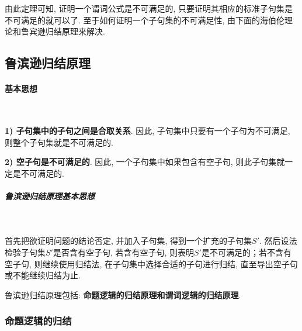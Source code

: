 由此定理可知, 证明一个谓词公式是不可满足的, 只要证明其相应的标准子句集是不可满足的就可以了. 至于如何证明一个子句集的不可满足性, 由下面的海伯伦理论和鲁宾逊归结原理来解决.

\subsection{鲁滨逊归结原理}
\paragraph{基本思想}~{}

\textbf{1) 子句集中的子句之间是合取关系}. 因此, 子句集中只要有一个子句为不可满足, 则整个子句集就是不可满足的.

\textbf{2) 空子句是不可满足的}. 因此, 一个子句集中如果包含有空子句, 则此子句集就一定是不可满足的.
\subparagraph{鲁滨逊归结原理基本思想}~{}

首先把欲证明问题的结论否定, 并加入子句集, 得到一个扩充的子句集$S'$. 然后设法检验子句集$S'$是否含有空子句, 若含有空子句, 则表明$S'$是不可满足的；若不含有空子句, 则继续使用归结法, 在子句集中选择合适的子句进行归结, 直至导出空子句或不能继续归结为止.

鲁滨逊归结原理包括: \textbf{命题逻辑的归结原理和谓词逻辑的归结原理}.
\subsubsection{命题逻辑的归结}~{}

